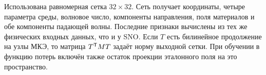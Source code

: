 Использована равномерная сетка $32\times32$. Сеть получает координаты, четыре параметра среды, волновое число, компоненты направления, поля материалов и обе компоненты падающей волны. Последние признаки вычислены из тех же физических входных данных, что и у SNO. Если $T$ есть билинейное продолжение на узлы МКЭ, то матрица $T^\mathsf T MT$ задаёт норму выходной сетки. При обучении в функцию потерь включён также остаток проекции эталонного поля на это пространство.
